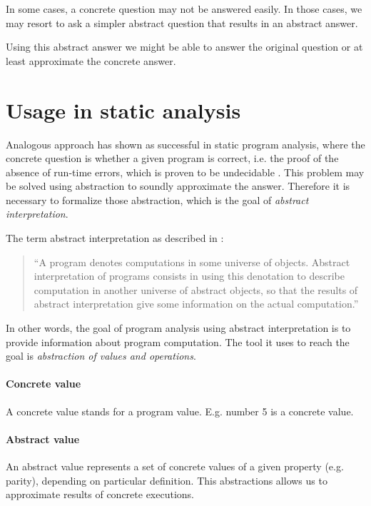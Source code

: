 \documentclass[12pt,oneside]{fithesis2}
\theoremstyle{definition}
\begin{document}
In some cases, a concrete question may not be answered easily. In those cases, we may resort to ask a simpler abstract question that results in an abstract answer.

Using this abstract answer we might be able to answer the original question or at least approximate the concrete answer. \cite{CousotCousot04-WCC}

\section{Usage in static analysis}

Analogous approach has shown as successful in static program analysis, where the concrete question is whether a given program is correct, i.e. the proof of the absence of run-time errors, which is proven to be undecidable \cite{mine-AIAA10}. This problem may be solved using abstraction to soundly approximate the answer. Therefore it is necessary to formalize those abstraction, which is the goal of \textit{abstract interpretation}.

The term abstract interpretation as described in \cite{CousotCousot77-1}:

\begin{quotation}
``A program denotes computations in some universe of objects. Abstract interpretation of programs consists in using this denotation to describe computation in another universe of abstract objects, so that the results of abstract interpretation give some information on the actual computation.''
\end{quotation}

In other words, the goal of program analysis using abstract interpretation is to provide information about program computation. The tool it uses to reach the goal is \textit{abstraction of values and operations}.

\paragraph{Concrete value}
A concrete value stands for a program value. E.g. number 5 is a concrete value.

\paragraph{Abstract value}
An abstract value represents a set of concrete values of a given property (e.g. parity), depending on particular definition. This abstractions allows us to approximate results of concrete executions.
\end{document}
